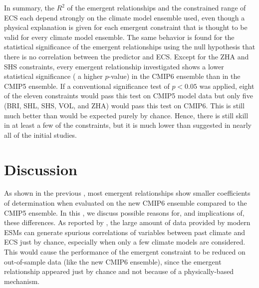 In summary, the $R^2$ of the emergent relationships and the constrained range
of \ac{ECS} each depend strongly on the climate model ensemble used, even
though a physical explanation is given for each emergent constraint that is
thought to be valid for every climate model ensemble. The same behavior is
found for the statistical significance of the emergent relationships using the
null hypothesis that there is no correlation between the predictor and
\ac{ECS}. Except for the ZHA and SHS constraints, every emergent relationship
investigated shows a lower statistical significance (\ie{} a higher $p$-value)
in the \acs{CMIP}6 ensemble than in the \acs{CMIP}5 ensemble. If a conventional
significance test of $p < 0.05$ was applied, eight of the eleven constraints
would pass this test on \acs{CMIP}5 model data but only five (BRI, SHL, SHS,
VOL, and ZHA) would pass this test on \acs{CMIP}6. This is still much better
than would be expected purely by chance. Hence, there is still skill in at
least a few of the constraints, but it is much lower than suggested in nearly
all of the initial studies.


\section{Discussion}
\label{sec:05:discussion}

As shown in the previous ,
most emergent relationships show smaller coefficients of determination when
evaluated on the new \acs{CMIP}6 ensemble compared to the \acs{CMIP}5 ensemble.
In this , we discuss possible reasons for, and
implications of, these differences. As reported by \textcite{Caldwell2014}, the
large amount of data provided by modern \acp{ESM} can generate spurious
correlations of variables between past climate and \ac{ECS} just by chance,
especially when only a few climate models are considered. This would cause the
performance of the emergent constraint to be reduced on out-of-sample data
(like the new \acs{CMIP}6 ensemble), since the emergent relationship appeared
just by chance and not because of a physically-based mechanism.

